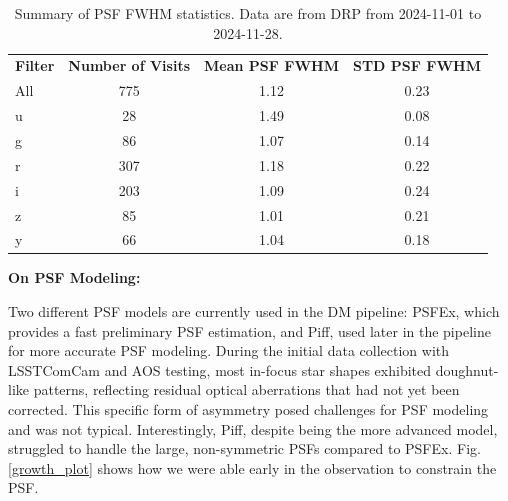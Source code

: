 \begin{table}
\centering
\begin{tabular}{@{}lccc@{}}
\textbf{Filter} & \textbf{Number of Visits} & \textbf{Mean PSF FWHM} & \textbf{STD PSF FWHM} \\ 
All           & 775                      & 1.12                   & 0.23                  \\
u             & 28                       & 1.49                   & 0.08                  \\
g             & 86                       & 1.07                   & 0.14                  \\
r             & 307                      & 1.18                   & 0.22                  \\
i             & 203                      & 1.09                   & 0.24                  \\
z             & 85                       & 1.01                   & 0.21                  \\
y             & 66                       & 1.04                   & 0.18                  \\ 
\end{tabular}
\caption{Summary of PSF FWHM statistics. Data are from DRP from 2024-11-01 to 2024-11-28.}
\label{tab:psf_summary}
\end{table}


\textbf{On PSF Modeling:}

Two different PSF models are currently used in the DM pipeline: PSFEx, which provides a fast preliminary PSF estimation, and Piff, used later in the pipeline for more accurate PSF modeling. During the initial data collection with LSSTComCam and AOS testing, most in-focus star shapes exhibited doughnut-like patterns, reflecting residual optical aberrations that had not yet been corrected. This specific form of asymmetry posed challenges for PSF modeling and was not typical. Interestingly, Piff, despite being the more advanced model, struggled to handle the large, non-symmetric PSFs compared to PSFEx. Fig. \ref{growth_plot} shows how we were able early in the observation to constrain the PSF.



